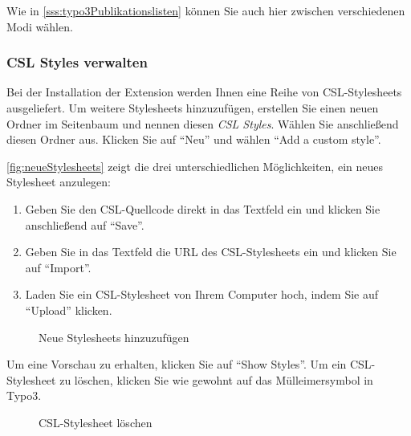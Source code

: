 Wie in \autoref{sss:typo3Publikationslisten} können Sie auch hier zwischen verschiedenen Modi wählen.
\subsubsection*{CSL Styles verwalten}\label{typo3CslBackend}

Bei der Installation der Extension werden Ihnen eine Reihe von CSL-Stylesheets ausgeliefert. Um weitere Stylesheets hinzuzufügen, erstellen Sie einen neuen Ordner im Seitenbaum und nennen diesen \textit{CSL Styles}. Wählen Sie anschließend diesen Ordner aus. Klicken Sie auf \enquote{Neu} und wählen \enquote{Add a custom style}.

\autoref{fig:neueStylesheets} zeigt die drei unterschiedlichen Möglichkeiten, ein neues Stylesheet anzulegen:
\begin{enumerate}
\item Geben Sie den CSL-Quellcode direkt in das Textfeld ein und klicken Sie anschließend auf \enquote{Save}.
\item Geben Sie in das Textfeld die URL des CSL-Stylesheets ein und klicken Sie auf \enquote{Import}.
\item Laden Sie ein CSL-Stylesheet von Ihrem Computer hoch, indem Sie auf \enquote{Upload} klicken. 
\end{enumerate}
\begin{figure}[h!]
 \centering
 \caption{Neue Stylesheets hinzuzufügen}
 \label{fig:neueStylesheets}
\end{figure}
Um eine Vorschau zu erhalten, klicken Sie auf \enquote{Show Styles}.\newline
Um ein CSL-Stylesheet zu löschen, klicken Sie wie gewohnt auf das Mülleimersymbol in Typo3. 
\begin{figure}[h!]
 \centering
 \caption{CSL-Stylesheet löschen}
 \label{fig:cslLoeschen}
\end{figure}
